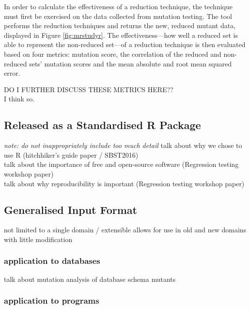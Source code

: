 In order to calculate the effectiveness of a reduction technique, the technique
must first be exercised on the data collected from mutation testing. The \mr tool
performs the reduction techniques and returns the new, reduced mutant data,
displayed in Figure \ref{fig:mrstudyr}. The effectiveness---how well a reduced set is able to represent
the non-reduced set---of a reduction technique is then evaluated
based on four metrics: mutation score, the correlation of the reduced and non-reduced sets' mutation scores
and the mean absolute and root mean squared error.

DO I FURTHER DISCUSS THESE METRICS HERE?? \\
I think so.

\subsection{Released as a Standardised R Package}
\textit{note: do not inappropriately include too much detail}
talk about why we chose to use R (hitchhiker's guide paper / SBST2016)\\
talk about the importance of free and open-source software (Regression testing workshop paper)\\
talk about why reproducibility is important (Regression testing workshop paper)


\subsection{Generalised Input Format}
not limited to a single domain / extensible
allows for use in old and new domains with little modification
    \subsubsection{application to databases}
    talk about mutation analysis of database schema mutants
    \subsubsection{application to programs}

